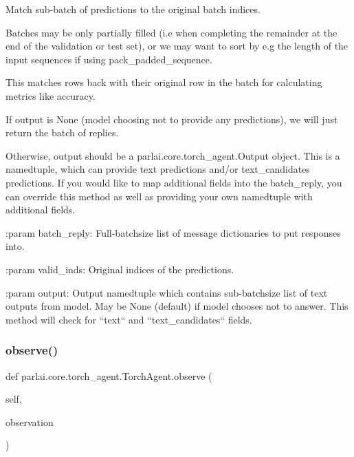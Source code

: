 \begin{DoxyVerb}Match sub-batch of predictions to the original batch indices.

Batches may be only partially filled (i.e when completing the remainder
at the end of the validation or test set), or we may want to sort by
e.g the length of the input sequences if using pack_padded_sequence.

This matches rows back with their original row in the batch for
calculating metrics like accuracy.

If output is None (model choosing not to provide any predictions), we
will just return the batch of replies.

Otherwise, output should be a parlai.core.torch_agent.Output object.
This is a namedtuple, which can provide text predictions and/or
text_candidates predictions. If you would like to map additional
fields into the batch_reply, you can override this method as well as
providing your own namedtuple with additional fields.

:param batch_reply:
    Full-batchsize list of message dictionaries to put responses into.

:param valid_inds:
    Original indices of the predictions.

:param output:
    Output namedtuple which contains sub-batchsize list of text outputs
    from model. May be None (default) if model chooses not to answer.
    This method will check for ``text`` and ``text_candidates`` fields.
\end{DoxyVerb}
 \mbox{\label{classparlai_1_1core_1_1torch__agent_1_1TorchAgent_a87b18f0d6ab11be3c49375af072d0d33}} 
\subsubsection{\texorpdfstring{observe()}{observe()}}
{\footnotesize\ttfamily def parlai.\+core.\+torch\+\_\+agent.\+Torch\+Agent.\+observe (\begin{DoxyParamCaption}\item[{}]{self,  }\item[{}]{observation }\end{DoxyParamCaption})}

